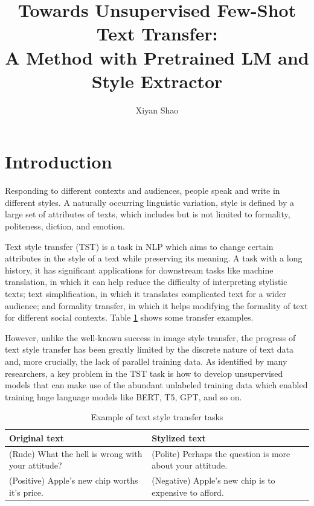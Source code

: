 \documentclass[a2paper]{article}
\author{Xiyan Shao}
\title{Towards Unsupervised Few-Shot Text Transfer: \\ A Method with Pretrained LM and Style Extractor}
\begin{document}
\maketitle
\section{Introduction}
Responding to different contexts and audiences, people speak and write in different styles. A naturally occurring linguistic variation, style is defined by a large set of attributes of texts, which includes but is not limited to formality, politeness, diction, and emotion.

Text style transfer (TST) is a task in NLP which aims to change certain attributes in the style of a text while preserving its meaning. A task with a long history, it has significant applications for downstream tasks like machine translation, in which it can help reduce the difficulty of interpreting stylistic texts; text simplification, in which it translates complicated text for a wider audience; and formality transfer, in which it helps modifying the formality of text for different social contexts. Table \ref{tab:original_and_stylized_text} shows some transfer examples.

However, unlike the well-known success in image style transfer, the progress of text style transfer has been greatly limited by the discrete nature of text data and, more crucially, the lack of parallel training data. As identified by many researchers, a key problem in the TST task is how to develop unsupervised models that can make use of the abundant unlabeled training data which enabled training huge language models like BERT, T5, GPT, and so on.

\begin{table}[h!]
\centering
\label{tab:original_and_stylized_text}
\begin{tabularx}{\linewidth}{XX}
Original text & Stylized text \\ \midrule 
(Rude) What the hell is wrong with your attitude? & (Polite) Perhaps the question is more about your attitude.\\
(Positive) Apple's new chip worths it's price. & (Negative) Apple's new chip is to expensive to afford.\\
\end{tabularx}
\caption{Example of text style transfer tasks}
\label{tab:original_and_stylized_text}
\end{table}
\end{document}
